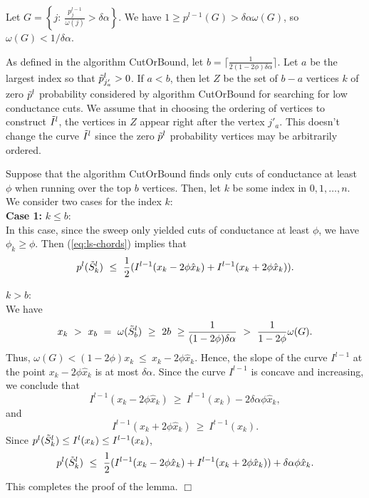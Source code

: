 \documentclass[11pt]{article}
\newenvironment{myproof}{\noindent {\sc Proof:}}{$\Box$}
\newcommand\CutOrBound{{\sc CutOrBound}\xspace}
\newcommand\volls{\omega}
\begin{document}
\begin{myproof}
Let $G = \left\{j:\ \frac{p^{l-1}_j}{\volls(j)} > \delta\alpha\right\}$.
We have $1 \geq p^{l-1}(G) > \delta\alpha\volls(G)$, so $\volls(G) < 1/\delta\alpha$.

As defined in the algorithm \CutOrBound, let $b = \lceil \frac{1}{2(1 - 2\phi)\delta\alpha}\rceil$. Let $a$ be the largest index so that $\tilde{p}^l_{j'_{a}} > 0$. If $a < b$, then let $Z$ be the set of $b - a$ vertices $k$ of zero $\tilde{p}^l$ probability considered by algorithm \CutOrBound for searching for low conductance cuts. We assume that in choosing the ordering of vertices to construct $\tilde{I}^l$, the vertices in $Z$ appear right after the vertex $j'_{a}$. This doesn't change the curve $\tilde{I}^l$ since the zero $\tilde{p}^l$ probability vertices may be arbitrarily ordered.


Suppose that the algorithm \CutOrBound finds only cuts of conductance at least
$\phi$ when running over the top $b$ vertices. Then, let $k$ be some index in $0,
1, \ldots, n$. We consider two cases for the index
$k$:\\
{\bf Case 1:} $k \leq b$:\\
In this case, since the sweep only yielded cuts of conductance at least $\phi$, we have $\phi_k \geq \phi$. Then (\ref{eq:ls-chords}) implies that
$$p^l(\tilde{S}^l_k)\ \leq\ \frac{1}{2}(I^{l-1}(x_k - 2\phi \hat{x}_k) + I^{l-1}(x_k + 2\phi \hat{x}_k)).$$

  $k > b$:\\
We have
$$x_k\ >\ x_{b}\ =\ \volls(\Stil^l_b)\ \geq\ 2b\ \geq \frac{1}{(1-2\phi)\delta\alpha}\ >\ \frac{1}{1-2\phi}\volls(G).$$ Thus,
$\volls(G) < (1- 2\phi)x_k\ \leq\ x_k - 2\phi\hat{x}_k$.
Hence, the slope of the curve $I^{l-1}$ at the point $x_k - 2\phi \hat{x}_k$
is at most $\delta\alpha$. Since the curve $I^{l-1}$ is concave and
increasing, we conclude that
$$I^{l-1}(x_k - 2\phi\hat{x}_k)\ \geq\ I^{l-1}(x_k) - 2\delta\alpha\phi\hat{x}_k,$$
and
$$I^{l-1}(x_k + 2\phi \hat{x}_k)\ \geq\ I^{t-1}(x_k).$$
Since $p^l(\tilde{S}^l_k) \leq I^l(x_k) \leq I^{l-1}(x_k)$,
$$p^l(\Stil^l_k)\ \leq\ \frac{1}{2}(I^{l-1}(x_k - 2\phi\hat{x}_k) + I^{l-1}(x_k + 2\phi\hat{x}_k)) + \delta\alpha \phi \hat{x}_k.$$
This completes the proof of the lemma.
\end{myproof}
\end{document}
